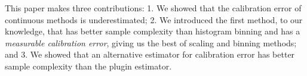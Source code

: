 This paper makes three contributions: 1. We showed that the calibration error of continuous methods is underestimated; 2. We introduced the first method, to our knowledge, that has better sample complexity than histogram binning and has a \emph{measurable calibration error}, giving us the best of scaling and binning methods; and 3. We showed that an alternative estimator for calibration error has better sample complexity than the plugin estimator.
